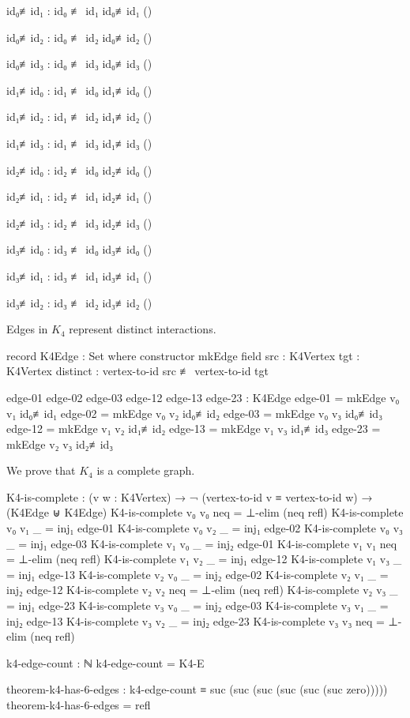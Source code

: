 \documentclass[11pt,a4paper]{book}
\begin{document}
\begin{code}
id₀≢id₁ : id₀ ≢ id₁
id₀≢id₁ ()

id₀≢id₂ : id₀ ≢ id₂
id₀≢id₂ ()

id₀≢id₃ : id₀ ≢ id₃
id₀≢id₃ ()

id₁≢id₀ : id₁ ≢ id₀
id₁≢id₀ ()

id₁≢id₂ : id₁ ≢ id₂
id₁≢id₂ ()

id₁≢id₃ : id₁ ≢ id₃
id₁≢id₃ ()

id₂≢id₀ : id₂ ≢ id₀
id₂≢id₀ ()

id₂≢id₁ : id₂ ≢ id₁
id₂≢id₁ ()

id₂≢id₃ : id₂ ≢ id₃
id₂≢id₃ ()

id₃≢id₀ : id₃ ≢ id₀
id₃≢id₀ ()

id₃≢id₁ : id₃ ≢ id₁
id₃≢id₁ ()

id₃≢id₂ : id₃ ≢ id₂
id₃≢id₂ ()
\end{code}

Edges in $K_4$ represent distinct interactions.

\begin{code}
record K4Edge : Set where
  constructor mkEdge
  field
    src      : K4Vertex
    tgt      : K4Vertex
    distinct : vertex-to-id src ≢ vertex-to-id tgt

edge-01 edge-02 edge-03 edge-12 edge-13 edge-23 : K4Edge
edge-01 = mkEdge v₀ v₁ id₀≢id₁
edge-02 = mkEdge v₀ v₂ id₀≢id₂
edge-03 = mkEdge v₀ v₃ id₀≢id₃
edge-12 = mkEdge v₁ v₂ id₁≢id₂
edge-13 = mkEdge v₁ v₃ id₁≢id₃
edge-23 = mkEdge v₂ v₃ id₂≢id₃

\end{code}

We prove that $K_4$ is a complete graph.

\begin{code}
K4-is-complete : (v w : K4Vertex) → ¬ (vertex-to-id v ≡ vertex-to-id w) → 
                 (K4Edge ⊎ K4Edge)
K4-is-complete v₀ v₀ neq = ⊥-elim (neq refl)
K4-is-complete v₀ v₁ _   = inj₁ edge-01
K4-is-complete v₀ v₂ _   = inj₁ edge-02
K4-is-complete v₀ v₃ _   = inj₁ edge-03
K4-is-complete v₁ v₀ _   = inj₂ edge-01
K4-is-complete v₁ v₁ neq = ⊥-elim (neq refl)
K4-is-complete v₁ v₂ _   = inj₁ edge-12
K4-is-complete v₁ v₃ _   = inj₁ edge-13
K4-is-complete v₂ v₀ _   = inj₂ edge-02
K4-is-complete v₂ v₁ _   = inj₂ edge-12
K4-is-complete v₂ v₂ neq = ⊥-elim (neq refl)
K4-is-complete v₂ v₃ _   = inj₁ edge-23
K4-is-complete v₃ v₀ _   = inj₂ edge-03
K4-is-complete v₃ v₁ _   = inj₂ edge-13
K4-is-complete v₃ v₂ _   = inj₂ edge-23
K4-is-complete v₃ v₃ neq = ⊥-elim (neq refl)

k4-edge-count : ℕ
k4-edge-count = K4-E

theorem-k4-has-6-edges : k4-edge-count ≡ suc (suc (suc (suc (suc (suc zero)))))
theorem-k4-has-6-edges = refl

\end{code}
\end{document}
